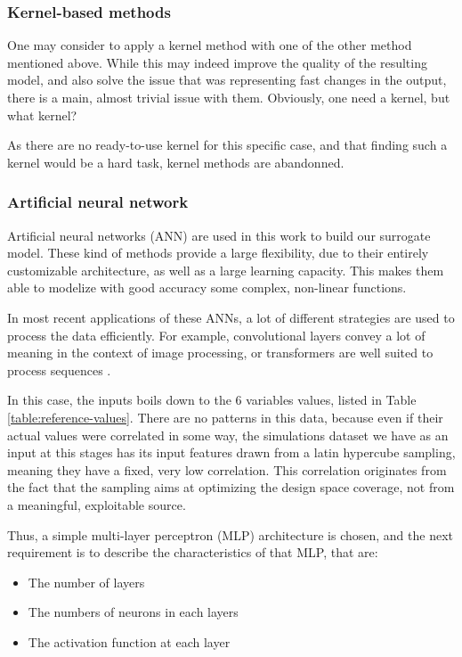 \subsubsection{Kernel-based methods\label{section:kernel-methods}}

One may consider to apply a kernel method with one of the other method mentioned above. While this may indeed improve the quality of the resulting model, and also solve the issue that was representing fast changes in the output, there is a main, almost trivial issue with them. Obviously, one need a kernel, but what kernel?

As there are no ready-to-use kernel for this specific case, and that finding such a kernel would be a hard task, kernel methods are abandonned.

\subsubsection{Artificial neural network}

Artificial neural networks (ANN) are used in this work to build our surrogate model. These kind of methods provide a large flexibility, due to their entirely customizable architecture, as well as a large learning capacity. This makes them able to modelize with good accuracy some complex, non-linear functions.

In most recent applications of these ANNs, a lot of different strategies are used to process the data efficiently. For example, convolutional layers convey a lot of meaning in the context of image processing, or transformers are well suited to process sequences \cite{deep-learning-class}.

In this case, the inputs boils down to the 6 variables values, listed in Table \ref{table:reference-values}. There are no patterns in this data, because even if their actual values were correlated in some way, the simulations dataset we have as an input at this stages has its input features drawn from a latin hypercube sampling, meaning they have a fixed, very low correlation. This correlation originates from the fact that the sampling aims at optimizing the design space coverage, not from a meaningful, exploitable source.

Thus, a simple multi-layer perceptron (MLP) architecture is chosen, and the next requirement is to describe the characteristics of that MLP, that are:
\begin{itemize}
    \item The number of layers
    \item The numbers of neurons in each layers
    \item The activation function at each layer
\end{itemize}

